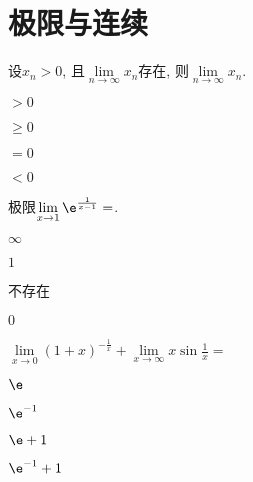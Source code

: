 \chapter{极限与连续}



\begin{problem}
	设$x_{n} > 0$, 且$\lim\limits_{n \rightarrow \infty}x_{n}$存在, 则$\lim\limits_{n \rightarrow \infty}x_{n}$.
	\begin{abcd} 
		\item $> 0$
		
		\item $\geq 0$
		
		\item $= 0$
		
		\item $< 0$
		
	\end{abcd} 
\end{problem} 

\begin{problem}
	极限$\displaystyle \lim\limits_{x \rightarrow 1}\e^{\frac{1}{x - 1}} =$.
	
	\begin{abcd} 
		\item $\infty$
		
		\item $1$
		
		\item 不存在
		
		\item $0$
		
	\end{abcd} 
	
	
\end{problem} 

\begin{problem}
	$\lim\limits_{x \rightarrow 0}(1 + x)^{- \frac{1}{x}} + \lim\limits_{x \rightarrow \infty}x\sin\frac{1}{x} =$
	
	\begin{abcd} 
		\item $\e$
		
		\item $\e^{-1}$
		
		\item $\e+1$
		
		\item $\e^{-1}+1$
		
	\end{abcd}
	
	
\end{problem} 


